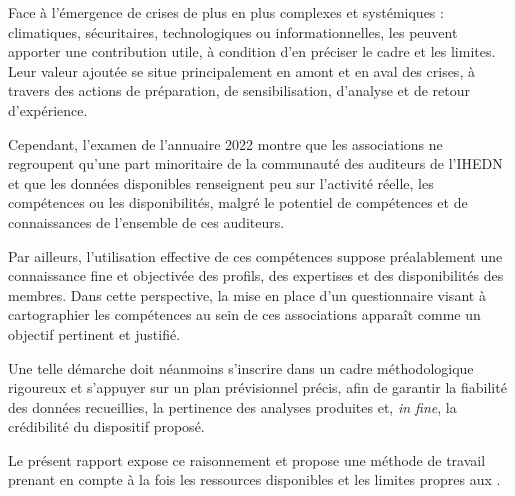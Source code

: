 Face à l'émergence de crises de plus en plus complexes et systémiques : climatiques, sécuritaires, technologiques ou informationnelles, les \AssociationsUnionIHEDN{} peuvent apporter une contribution utile, à condition d'en préciser le cadre et les limites. Leur valeur ajoutée se situe principalement en amont et en aval des crises, à travers des actions de préparation, de sensibilisation, d'analyse et de retour d'expérience.

Cependant, l'examen de l'annuaire 2022 montre que les associations ne regroupent qu'une part minoritaire de la communauté des auditeurs de l'IHEDN et que les données disponibles renseignent peu sur l'activité réelle, les compétences ou les disponibilités, malgré le potentiel de compétences et de connaissances de l'ensemble de ces auditeurs.

Par ailleurs, l'utilisation effective de ces compétences suppose préalablement une connaissance fine et objectivée des profils, des expertises et des disponibilités des membres. Dans cette perspective, la mise en place d'un questionnaire visant à cartographier les compétences au sein de ces associations apparaît comme un objectif pertinent et justifié.

Une telle démarche doit néanmoins s'inscrire dans un cadre méthodologique rigoureux et s'appuyer sur un plan prévisionnel précis, afin de garantir la fiabilité des données recueillies, la pertinence des analyses produites et, \textit{in fine}, la crédibilité du dispositif proposé.

Le présent rapport expose ce raisonnement et propose une méthode de travail prenant en compte à la fois les ressources disponibles et les limites propres aux \AssociationsUnionIHEDN.
